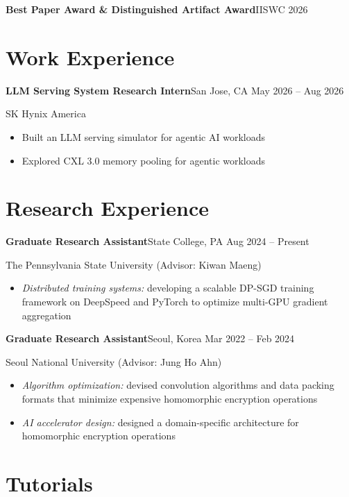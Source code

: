 \documentclass[11pt,letterpaper]{article}
\newenvironment{details}
  {\begin{itemize}[leftmargin=1.3em,itemsep=0.12em,topsep=0.2em,parsep=0pt]}
  {\end{itemize}}
\newcommand{\entry}[2]{\textbf{#1}\hfill #2\par}
\begin{document}
\entry{Best Paper Award \& Distinguished Artifact Award}{IISWC 2026}

\section{Work Experience}

\begin{samepage}
\entry{LLM Serving System Research Intern}{San Jose, CA \quad May 2026 -- Aug 2026}
SK Hynix America
\begin{details}
  \item Built an LLM serving simulator for agentic AI workloads
  \item Explored CXL 3.0 memory pooling for agentic workloads
\end{details}
\end{samepage}

\section{Research Experience}

\entry{Graduate Research Assistant}{State College, PA \quad Aug 2024 -- Present}
The Pennsylvania State University \quad (Advisor: Kiwan Maeng)
\begin{details}
  \item \textit{Distributed training systems:} developing a scalable DP-SGD training
    framework on DeepSpeed and PyTorch to optimize multi-GPU gradient aggregation
\end{details}

\vspace{0.5em}
\entry{Graduate Research Assistant}{Seoul, Korea \quad Mar 2022 -- Feb 2024}
Seoul National University \quad (Advisor: Jung Ho Ahn)
\begin{details}
  \item \textit{Algorithm optimization:} devised convolution algorithms and data packing
    formats that minimize expensive homomorphic encryption operations
  \item \textit{AI accelerator design:} designed a domain-specific architecture for
    homomorphic encryption operations
\end{details}

\section{Tutorials}
\end{document}
